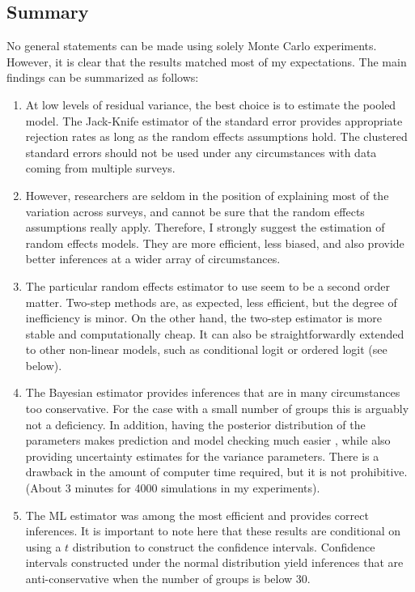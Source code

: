 \subsection{Summary}

No general statements can be made using solely Monte Carlo experiments. However, it is clear that the results matched most of my expectations. The main findings can be summarized  as follows:

\begin{enumerate}

\item At low levels of residual variance, the best choice is to estimate the pooled model.  The Jack-Knife estimator of the standard error provides appropriate rejection rates as long as the random effects assumptions hold. The clustered standard errors should not be used under any circumstances with data coming from multiple surveys.

\item However, researchers are seldom in the position of explaining most of the variation across surveys, and cannot be sure that the random effects assumptions really apply. Therefore, I strongly suggest the estimation of random effects models. They are  more efficient, less biased, and also provide better inferences at a wider array of circumstances.

\item The particular random effects estimator to use seem to be a second order matter. Two-step methods are, as expected, less efficient, but the degree of inefficiency is minor.  On the other hand, the two-step estimator is more stable and computationally cheap. It can also be straightforwardly extended to other non-linear models, such as conditional logit \citep{glazerman:1998} or ordered logit (see below).

\item The Bayesian estimator provides  inferences that are in many circumstances too conservative. For the case with a small number of groups this is arguably not a deficiency. In addition, having the posterior distribution of the parameters makes prediction and model checking much easier \citep[chapter 6]{gelman:2004a}, while also providing uncertainty estimates for the variance parameters.  There is a drawback in the amount of  computer time required, but it is not prohibitive. (About 3 minutes for 4000 simulations in my experiments).

\item The ML estimator was among the most efficient and provides correct inferences.  It is important to note here that these results are conditional on using a $t$ distribution to construct the confidence intervals. Confidence intervals constructed under the normal distribution yield inferences that are anti-conservative when the number of groups is below 30.

\end{enumerate}

